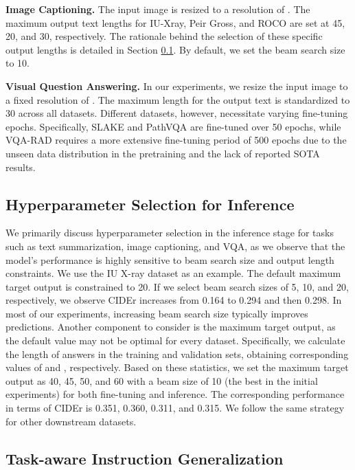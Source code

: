 \documentclass[10pt]{article} \usepackage[preprint]{tmlr}
\begin{document}
\vspace{5pt}
\noindent \textbf{Image Captioning.} The input image is resized to a resolution of . The maximum output text lengths for IU-Xray, Peir Gross, and ROCO are set at 45, 20, and 30, respectively. The rationale behind the selection of these specific output lengths is detailed in Section \ref{sec:hyper_infer}. By default, we set the beam search size to 10.

\vspace{5pt}
\noindent \textbf{Visual Question Answering.} In our experiments, we resize the input image to a fixed resolution of . The maximum length for the output text is standardized to 30 across all datasets. Different datasets, however, necessitate varying fine-tuning epochs. Specifically, SLAKE and PathVQA are fine-tuned over 50 epochs, while VQA-RAD requires a more extensive fine-tuning period of 500 epochs due to the unseen data distribution in the pretraining and the lack of reported SOTA results.




\subsection{Hyperparameter Selection for Inference} \label{sec:hyper_infer}

We primarily discuss hyperparameter selection in the inference stage for tasks such as text summarization, image captioning, and VQA, as we observe that the model's performance is highly sensitive to beam search size and output length constraints. We use the IU X-ray dataset as an example. The default maximum target output is constrained to 20. If we select beam search sizes of 5, 10, and 20, respectively, we observe CIDEr increases from 0.164 to 0.294 and then 0.298. In most of our experiments, increasing beam search size typically improves predictions. Another component to consider is the maximum target output, as the default value may not be optimal for every dataset. Specifically, we calculate the length of answers in the training and validation sets, obtaining corresponding  values of  and , respectively. Based on these statistics, we set the maximum target output as 40, 45, 50, and 60 with a beam size of 10 (the best in the initial experiments) for both fine-tuning and inference. The corresponding performance in terms of CIDEr is 0.351, 0.360, 0.311, and 0.315. We follow the same strategy for other downstream datasets.

\subsection{Task-aware Instruction Generalization} \label{appx:instruct_generalization}
\end{document}
